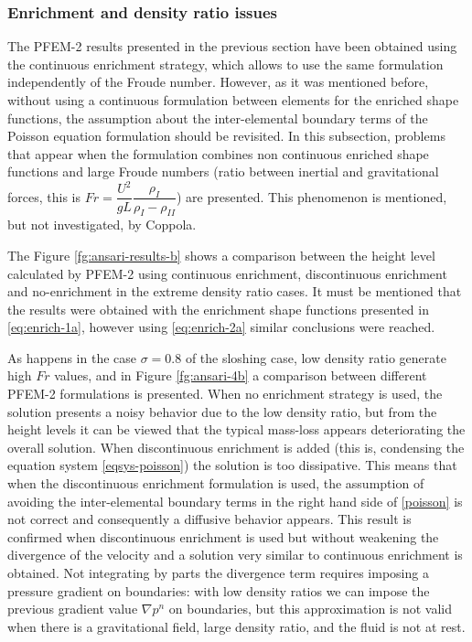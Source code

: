 \subsubsection{Enrichment and density ratio issues}

The PFEM-2 results presented in the previous section have been obtained using the continuous enrichment strategy, which allows to use the same formulation independently of the Froude number. However, as it was mentioned before, without using a continuous formulation between elements for the enriched shape functions, the assumption about the inter-elemental boundary terms of the Poisson equation formulation should be revisited. In this subsection, problems that appear when the formulation combines non continuous enriched shape functions and large Froude numbers (ratio between inertial and gravitational forces, this is $Fr = \dfrac{U^2}{gL}\dfrac{\rho_I}{\rho_I-\rho_{II}}$) are presented. This phenomenon is mentioned, but not investigated, by Coppola\cite{Coppola05}.

The Figure \ref{fg:ansari-results-b} shows a comparison between the height level calculated by PFEM-2 using continuous enrichment, discontinuous enrichment and no-enrichment in the extreme density ratio cases. It must be mentioned that the results were obtained with the enrichment shape functions presented in \ref{eq:enrich-1a}, however using \ref{eq:enrich-2a} similar conclusions were reached.

As happens in the case $\sigma=0.8$ of the sloshing case, low density ratio generate high $Fr$ values, and in Figure \ref{fg:ansari-4b} a comparison between different PFEM-2 formulations is presented. When no enrichment strategy is used, the solution presents a noisy behavior due to the low density ratio, but from the height levels it can be viewed that the typical mass-loss appears deteriorating the overall solution. When discontinuous enrichment is added (this is, condensing the equation system \ref{eqsys-poisson}) the solution is too dissipative. This means that when the discontinuous enrichment formulation is used, the assumption of avoiding the inter-elemental boundary terms in the right hand side of \ref{poisson} is not correct and consequently a diffusive behavior appears. This result is confirmed when discontinuous enrichment is used but without weakening the divergence of the velocity and a solution very similar to continuous enrichment is obtained. Not integrating by parts the divergence term requires imposing a pressure gradient on boundaries: with low density ratios we can impose the previous gradient value $\nabla p^n$ on boundaries, but this approximation is not valid when there is a gravitational field, large density ratio, and the fluid is not at rest.

